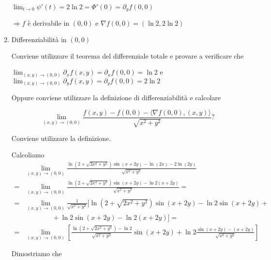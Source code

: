 \begin{exbar}
\begin{example}
\begin{enumerate}
		$\lim_{t\rightarrow0}\psi'(t)=2\ln 2=\Phi'(0)=\partial_y f(0,0)$
		
		$\Rightarrow f$ è derivabile in $(0,0)$ e $\nabla f(0,0) =(\ln2,2\ln2)$
		
		\item Differenziabilità in $(0,0)$
		
		Conviene utilizzare il teorema del differenziale totale e provare a verificare che 
		{\centering $\lim_{(x,y)\rightarrow(0,0)}\partial_xf(x,y)=\partial_xf(0,0)=\ln2$ e $\lim_{(x,y)\rightarrow(0,0)}\partial_y f(x,y)=\partial_y f(0,0)=2 \ln 2$ \par}
		
		Oppure conviene utilizzare la definizione di differenziabilità e calcolare
		
		$$\lim_{(x,y)\rightarrow(0,0)}\frac{f(x,y)-f(0,0)-\langle\nabla f(0,0),(x,y)\rangle}{\sqrt{x^2+y^2}}?$$
		
		{\color{red} Conviene utilizzare la definizione.}
		
		Calcoliamo 
		\begin{align*} 
			&\lim_{(x,y)\rightarrow(0,0)}\frac{\ln(2+\sqrt{2x^2+y^2})\sin(x+2y)-\ln(2x)-2\ln(2y)}{\sqrt{x^2+y^2}}
			\\
			=&\lim_{(x,y)\rightarrow(0,0)}\frac{\ln(2+\sqrt{2x^2+y^2})\sin(x+2y)-\ln2(x+2y)}{\sqrt{x^2+y^2}}=
			\\
			=&\lim_{(x,y)\rightarrow(0,0)}\frac{1}{\sqrt{x^2+y^2}} \big[ \ln(2+\sqrt{2x^2+y^2})\sin(x+2y)-\ln2\sin(x+2y)+
			\\
			& \qquad \qquad +\ln2\sin(x+2y)-\ln2(x+2y) \big]=
			\\
			=&\lim_{(x,y)\rightarrow(0,0)} \left[ \frac{\ln(2+\sqrt{2x^2+y^2})-\ln 2}{\sqrt{x^2+y^2}}\sin(x+2y) + \ln 2 \frac{\sin(x+2y)-(x+2y)}{\sqrt{x^2+y^2}}\right]
		\end{align*}
		
		Dimostriamo che 
		
		

\end{enumerate}
\end{example}
\end{exbar}
